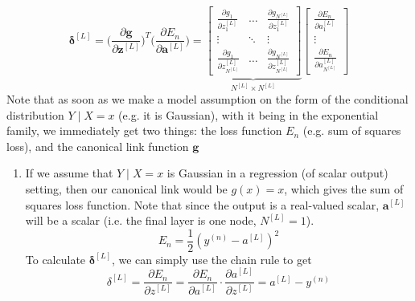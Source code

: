 \documentclass{article}
\begin{document}
\begin{algo}[Backpropagation]
\begin{equation}
      \boldsymbol{\delta}^{[L]} = \bigg( \frac{\partial \mathbf{g}}{\partial \mathbf{z}^{[L]}} \bigg)^T \bigg( \frac{\partial E_n}{\partial \mathbf{a}^{[L]}} \bigg) = \underbrace{\begin{bmatrix} \frac{\partial g_1}{\partial z_1^{[L]}} & \ldots & \frac{\partial g_{N^{[L]}}}{\partial z^{[L]}_1} \\ \vdots & \ddots & \vdots \\ \frac{\partial g_1}{\partial z^{[L]}_{N^{[L]}}} & \ldots & \frac{\partial g_{N^{[L]}}}{\partial z^{[L]}_{N^{[L]}}} \end{bmatrix}}_{N^{[L]} \times N^{[L]}} \begin{bmatrix} \frac{\partial E_n}{\partial a_1^{[L]}} \\ \vdots \\ \frac{\partial E_n}{\partial a_{N^{[L]}}^{[L]}} \end{bmatrix}
    \end{equation}
    Note that as soon as we make a model assumption on the form of the conditional distribution $Y \mid X = x$ (e.g. it is Gaussian), with it being in the exponential family, we immediately get two things: the loss function $E_n$ (e.g. sum of squares loss), and the canonical link function $\mathbf{g}$
    \begin{enumerate}
      \item If we assume that $Y \mid X = x$ is Gaussian in a regression (of scalar output) setting, then our canonical link would be $g(x) = x$, which gives the sum of squares loss function. Note that since the output is a real-valued scalar, $\mathbf{a}^{[L]}$ will be a scalar (i.e. the final layer is one node, $N^{[L]} = 1$). 
      \begin{equation}
        E_n = \frac{1}{2} (y^{(n)} - a^{[L]} )^2
      \end{equation}
      To calculate $\boldsymbol{\delta}^{[L]}$, we can simply use the chain rule to get 
      \begin{equation}
        \delta^{[L]} = \frac{\partial E_n}{\partial z^{[L]}} = \frac{\partial E_n}{\partial a^{[L]}} \cdot \frac{\partial a^{[L]}}{\partial z^{[L]}} = a^{[L]} - y^{(n)}
      \end{equation}


\end{enumerate}
\end{algo}
\end{document}
